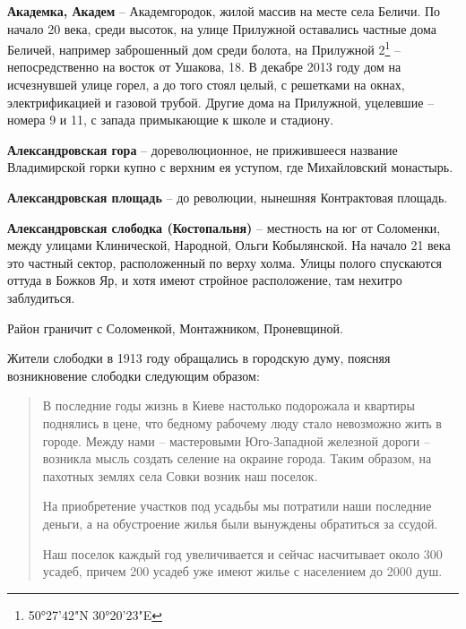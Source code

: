 \medskip

\textbf{Академка, Академ} – Академгородок, жилой массив на месте села Беличи. По начало 20 века, среди высоток, на улице Прилужной оставались частные дома Беличей, например заброшенный дом среди болота, на Прилужной 2\footnote{50°27'42"N 30°20'23"E} – непосредственно на восток от Ушакова, 18. В декабре 2013 году дом на исчезнувшей улице горел, а до того стоял целый, с решетками на окнах, электрификацией и газовой трубой. Другие дома на Прилужной, уцелевшие – номера 9 и 11, с запада примыкающие к школе и стадиону.\\

\medskip

\textbf{Александровская гора} – дореволюционное, не прижившееся название Владимирской горки купно с верхним ея уступом, где Михайловский монастырь.\\

\medskip

\textbf{Александровская площадь} – до революции, нынешняя Контрактовая площадь.\\ 

\medskip

\textbf{Александровская слободка (Костопальня)} – местность  на юг от Соломенки, между улицами Клинической, Народной, Ольги Кобылянской. На начало 21 века это частный сектор, расположенный по верху холма. Улицы полого спускаются оттуда в Божков Яр, и хотя имеют стройное расположение, там нехитро заблудиться.

Район граничит с Соломенкой, Монтажником, Проневщиной.

Жители слободки в 1913 году обращались в городскую думу, поясняя возникновение слободки следующим образом:

\begin{quotation}
В последние годы жизнь в Киеве настолько подорожала и квартиры по\-днялись в цене, что бедному рабочему люду стало невозможно жить в городе. Между нами – мастеровыми Юго-Западной железной дороги – возникла мысль создать селение на окраине города. Таким образом, на пахотных землях села Совки возник наш поселок.

На приобретение участков под уса\-дьбы мы потратили наши последние деньги, а на обустроение жилья были вынуждены обратиться за ссудой. 

Наш поселок каждый год увеличивается и сейчас насчитывает около 300 усадеб, причем 200 усадеб уже имеют жилье с населением до 2000 душ.
\end{quotation}

